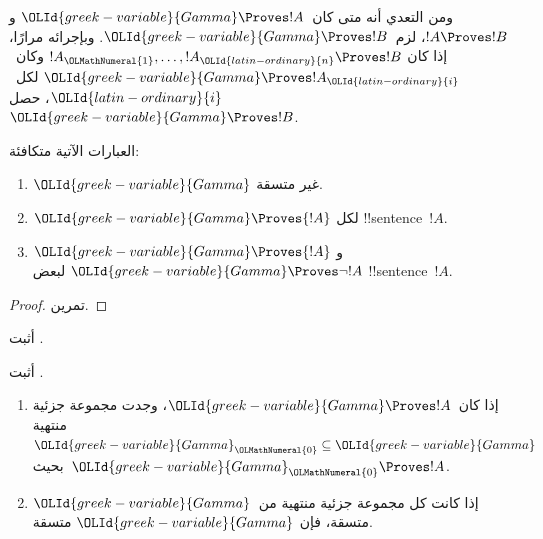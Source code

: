 \documentclass[../../../include/open-logic-section]{subfiles}
\begin{document}
ومن التعدي أنه متى كان~$\OLId{greek-variable}{Gamma} \Proves !A$ و$!A \Proves !B$،
لزم~$\OLId{greek-variable}{Gamma} \Proves !B$. وبإجرائه مرارًا، إذا كان
$!A_\OLMathNumeral{1}, \dots, !A_\OLId{latin-ordinary}{n} \Proves !B$ وكان~$\OLId{greek-variable}{Gamma} \Proves !A_\OLId{latin-ordinary}{i}$ لكل~$\OLId{latin-ordinary}{i}$،
حصل~$\OLId{greek-variable}{Gamma} \Proves !B$.

\begin{prop}
العبارات الآتية متكافئة:
    \begin{enumerate}
      \item \( \OLId{greek-variable}{Gamma} \) غير متسقة.
      \item \( \OLId{greek-variable}{Gamma} \Proves {!A} \) لكل !!{sentence}~\( {!A} \).
      \item \( \OLId{greek-variable}{Gamma} \Proves {!A} \) و\( \OLId{greek-variable}{Gamma} \Proves \lnot {!A} \) لبعض !!{sentence}~\( {!A} \).
    \end{enumerate}
\end{prop}

\begin{proof}
تمرين.
\end{proof}

\begin{prob}
أثبت .
\end{prob}
\tagendprob

\begin{prob}
أثبت .
\end{prob}
\tagendprob

\begin{prop}[التراص]
  \begin{enumerate}
  \item إذا كان~$\OLId{greek-variable}{Gamma} \Proves !A$، وجدت مجموعة جزئية منتهية
    $\OLId{greek-variable}{Gamma}_\OLMathNumeral{0} \subseteq \OLId{greek-variable}{Gamma}$ بحيث~$\OLId{greek-variable}{Gamma}_\OLMathNumeral{0} \Proves !A$.
  \item إذا كانت كل مجموعة جزئية منتهية من~$\OLId{greek-variable}{Gamma}$ متسقة، فإن
    $\OLId{greek-variable}{Gamma}$ متسقة.
  \end{enumerate}
\end{prop}
\end{document}
